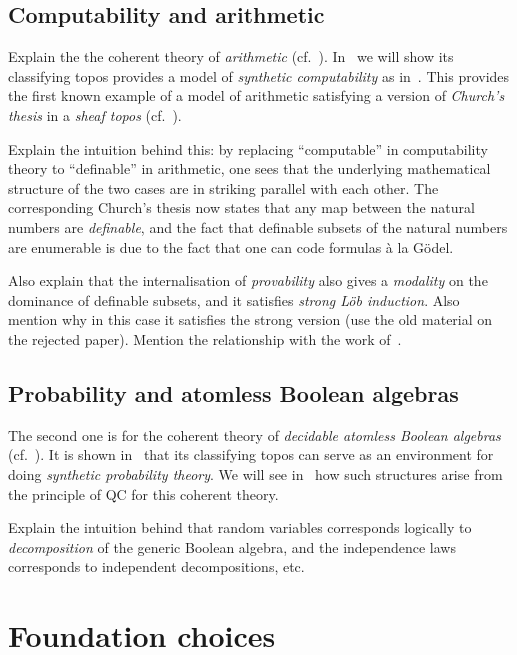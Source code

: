 \subsection{Computability and arithmetic}

Explain the the coherent theory of \emph{arithmetic} (cf.~\citet{ye_categorical_2026}). In~ we will show its classifying topos provides a model of \emph{synthetic computability} as in~\citet{bauer_first_2006}. This provides the first known example of a model of arithmetic satisfying a version of \emph{Church's thesis} in a \emph{sheaf topos} (cf.~\citet{bauer2026laugh}). 

Explain the intuition behind this: by replacing ``computable'' in computability theory to ``definable'' in arithmetic, one sees that the underlying mathematical structure of the two cases are in striking parallel with each other. The corresponding Church's thesis now states that any map between the natural numbers are \emph{definable}, and the fact that definable subsets of the natural numbers are enumerable is due to the fact that one can code formulas \`a la G\"odel. 

Also explain that the internalisation of \emph{provability} also gives a \emph{modality} on the dominance of definable subsets, and it satisfies \emph{strong L\"ob induction}. Also mention why in this case it satisfies the strong version (use the old material on the rejected paper). Mention the relationship with the work of~\citet{ramesh2023introspective}.

\subsection{Probability and atomless Boolean algebras}

The second one is for the coherent theory of \emph{decidable atomless Boolean algebras} (cf.~\citet[D3.4.12]{johnstone2002sketches}). It is shown in~\citet{SimpsonAlex2024EaCI} that its classifying topos can serve as an environment for doing \emph{synthetic probability theory}. We will see in~ how such structures arise from the principle of \gls{QC} for this coherent theory.

Explain the intuition behind that random variables corresponds logically to \emph{decomposition} of the generic Boolean algebra, and the independence laws corresponds to independent decompositions, etc.

\section{Foundation choices}\label{sec:foundation}

